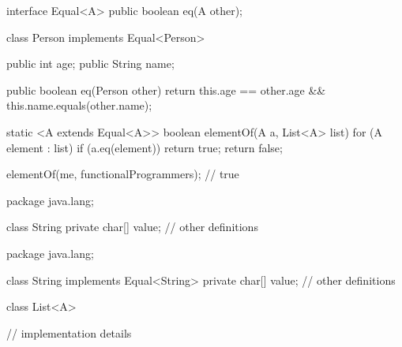 \documentclass[usenames,dvipsnames,svgnames,table,aspectratio=169,mathserif]{beamer}
\newcommand{\nl}{\vspace{\baselineskip}}
\newcommand{\pnl}{\pause \nl}
\begin{document}
\begin{frame}[fragile]
\begin{javacode}
interface Equal<A> {
  public boolean eq(A other);
}
\end{javacode}

\pause

\begin{javacode}
class Person implements Equal<Person> {
  public int age;
  public String name;

  public boolean eq(Person other) {
    return this.age == other.age && this.name.equals(other.name);
  }
}
\end{javacode}
\end{frame}


\begin{frame}[fragile]
\begin{javacode}
static <A extends Equal<A>> boolean elementOf(A a, List<A> list) {
  for (A element : list) {
    if (a.eq(element)) return true;
  }
  return false;
}
\end{javacode}

\pnl

\begin{javacode}
elementOf(me, functionalProgrammers);
// true
\end{javacode}
\end{frame}


\begin{frame}[fragile]
\begin{javacode}
package java.lang;

class String {
  private char[] value;
  // other definitions
}
\end{javacode}
\end{frame}


\begin{frame}[fragile]
\begin{javacode}
package java.lang;

class String implements Equal<String> {
  private char[] value;
  // other definitions
}
\end{javacode}
\end{frame}


\begin{frame}[fragile]
\begin{javacode}
class List<A> {
  // implementation details





}
\end{javacode}
\end{frame}
\end{document}
